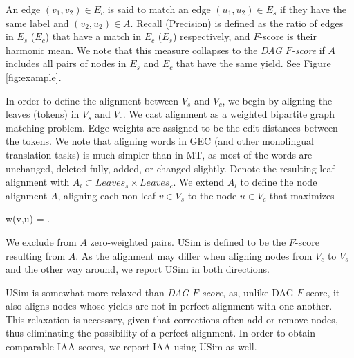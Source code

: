 \documentclass[a4paper, 11pt]{article}
\newenvironment{myequation*}{

	\begin{equation*}
}{
\end{equation*}

}
\begin{document}
An edge $(v_1,v_2) \in E_c$ is said to match an edge
$(u_1,u_2) \in E_s$ if they have the same label and $(v_2,u_2) \in A$. Recall (Precision)
is defined as the ratio of edges in $E_s$ ($E_c$) that have a match in $E_c$ ($E_s$) respectively, and
$F$-score is their harmonic mean. We note that this measure collapses to the
{\it DAG $F$-score} if $A$ includes all pairs of nodes in $E_s$ and $E_c$ that have
the same yield. See Figure \ref{fig:example}. 

In order to define the alignment between $V_s$ and $V_c$, we begin by aligning the leaves
(tokens) in $V_s$ and $V_c$.
We cast alignment as a weighted bipartite graph matching problem. Edge weights are assigned to be the edit distances between the tokens.
We note that aligning words in GEC (and other monolingual translation tasks) is much simpler than in MT,
as most of the words are unchanged, deleted fully, added, or changed slightly.
Denote the resulting leaf alignment with $A_l \subset Leaves_s \times Leaves_c$.
We extend $A_l$ to define the node alignment $A$, aligning each non-leaf $v \in V_s$
to the node $u \in V_c$ that maximizes


\begin{small}
 \begin{myequation*}
  w\left(v,u\right) = .
 \end{myequation*}

\end{small}

\noindent
We exclude from $A$ zero-weighted pairs.
{\sc USim} is defined to be the $F$-score resulting from $A$.
As the alignment may differ when aligning nodes from $V_c$ to $V_s$
and the other way around, we report {\sc USim} in both directions.

{\sc USim} is somewhat more relaxed than {\it DAG $F$-score},
as, unlike DAG $F$-score, it also aligns nodes whose yields are not in perfect alignment with one another.
This relaxation is necessary, given that corrections often add
or remove nodes, thus eliminating the possibility of a perfect alignment.
In order to obtain comparable IAA scores, we report IAA using {\sc USim} as well.
%
\end{document}
